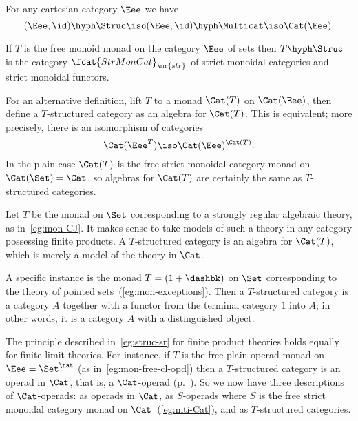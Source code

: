\begin{example}
For any cartesian category $\Eee$ we have 
\[
(\Eee,\id)\hyph\Struc \iso (\Eee,\id)\hyph\Multicat \iso \Cat(\Eee).
\]
\end{example}

\begin{example}
If $T$ is the free monoid monad on the category $\Eee$ of sets then
$T\hyph\Struc$ is the category $\fcat{StrMonCat}_\mr{str}$ of strict%
%
%
monoidal categories and strict monoidal functors.
\end{example}

For an alternative definition, lift $T$ to a monad $\Cat(T)$ on
$\Cat(\Eee)$, then define a $T$-structured category as an algebra for
$\Cat(T)$.  This is equivalent; more precisely, there is an isomorphism of
categories
\[
\Cat(\Eee^T) \iso \Cat(\Eee)^{\Cat(T)}.
\]
In the plain case $\Cat(T)$ is the free strict monoidal category monad on
$\Cat(\Set) = \Cat$, so algebras for $\Cat(T)$ are certainly the same as
$T$-structured categories.

\begin{example}	
Let $T$ be the monad on $\Set$ corresponding to a strongly regular
algebraic theory, as in~\ref{eg:mon-CJ}.  It makes sense to take models of
such a theory in any category possessing finite products.  A $T$-structured
category is an algebra for $\Cat(T)$, which is merely a model of the theory
in $\Cat$.
\end{example}

\begin{example}	
A specific instance is the monad $T = (1 + \dashbk)$ on $\Set$
corresponding to the theory of pointed sets~(\ref{eg:mon-exceptions}).
Then a $T$-structured category is a category $A$ together with a functor
from the terminal category $1$ into $A$; in other words, it is a category
$A$ with a distinguished object.
\end{example}

\begin{example}	
The principle described in~\ref{eg:struc-sr} for finite product theories
holds equally for finite limit theories.  For instance, if $T$ is the free
plain operad monad on $\Eee = \Set^\nat$ (as in~\ref{eg:mon-free-cl-opd})
then a $T$-structured category is an operad in $\Cat$, that is, a
$\Cat$-operad (p.~\pageref{p:defn-V-Operad}).  So we now have three
descriptions of $\Cat$-operads:%
%
%
as operads in $\Cat$, as $S$-operads where
$S$ is the free strict monoidal category monad on
$\Cat$~(\ref{eg:mti-Cat}), and as $T$-structured categories.
\end{example}

